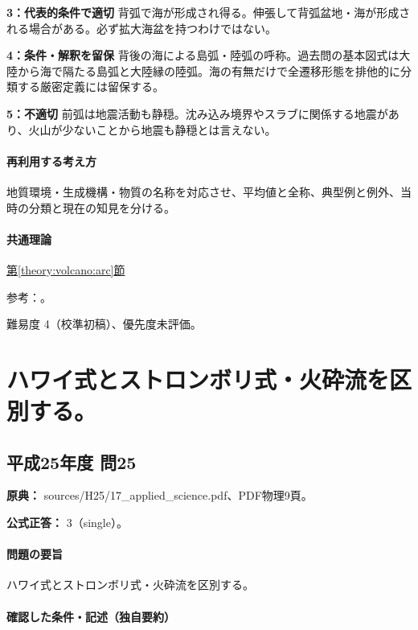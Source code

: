 \noindent\textbf{3：代表的条件で適切} 背弧で海が形成され得る。伸張して背弧盆地・海が形成される場合がある。必ず拡大海盆を持つわけではない。\par

\noindent\textbf{4：条件・解釈を留保} 背後の海による島弧・陸弧の呼称。過去問の基本図式は大陸から海で隔たる島弧と大陸縁の陸弧。海の有無だけで全遷移形態を排他的に分類する厳密定義には留保する。\par

\noindent\textbf{5：不適切} 前弧は地震活動も静穏。沈み込み境界やスラブに関係する地震があり、火山が少ないことから地震も静穏とは言えない。\par

\paragraph{再利用する考え方} 地質環境・生成機構・物質の名称を対応させ、平均値と全称、典型例と例外、当時の分類と現在の知見を分ける。

\paragraph{共通理論} \hyperref[theory:volcano:arc]{第\ref*{theory:volcano:arc}節}

\par 参考：\cite{usgs_plate_boundaries,vol50_subduction_ref}。

\par 難易度 4（校準初稿）、優先度未評価。

\section{ハワイ式とストロンボリ式・火砕流を区別する。}

\subsection{平成25年度 問25}
\label{q:h25-reg-applied-25}

\noindent\textbf{原典：} sources/H25/17\_applied\_science.pdf、PDF物理9頁。

\textbf{公式正答：} 3（single）。

\paragraph{問題の要旨} ハワイ式とストロンボリ式・火砕流を区別する。

\paragraph{確認した条件・記述（独自要約）}\mbox{}\par

